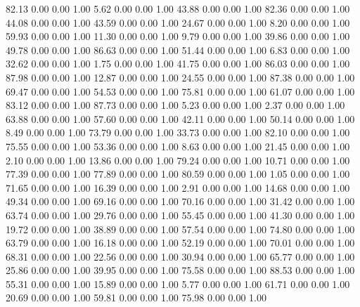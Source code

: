   82.13   0.00   0.00   1.00
    5.62   0.00   0.00   1.00
   43.88   0.00   0.00   1.00
   82.36   0.00   0.00   1.00
   44.08   0.00   0.00   1.00
   43.59   0.00   0.00   1.00
   24.67   0.00   0.00   1.00
    8.20   0.00   0.00   1.00
   59.93   0.00   0.00   1.00
   11.30   0.00   0.00   1.00
    9.79   0.00   0.00   1.00
   39.86   0.00   0.00   1.00
   49.78   0.00   0.00   1.00
   86.63   0.00   0.00   1.00
   51.44   0.00   0.00   1.00
    6.83   0.00   0.00   1.00
   32.62   0.00   0.00   1.00
    1.75   0.00   0.00   1.00
   41.75   0.00   0.00   1.00
   86.03   0.00   0.00   1.00
   87.98   0.00   0.00   1.00
   12.87   0.00   0.00   1.00
   24.55   0.00   0.00   1.00
   87.38   0.00   0.00   1.00
   69.47   0.00   0.00   1.00
   54.53   0.00   0.00   1.00
   75.81   0.00   0.00   1.00
   61.07   0.00   0.00   1.00
   83.12   0.00   0.00   1.00
   87.73   0.00   0.00   1.00
    5.23   0.00   0.00   1.00
    2.37   0.00   0.00   1.00
   63.88   0.00   0.00   1.00
   57.60   0.00   0.00   1.00
   42.11   0.00   0.00   1.00
   50.14   0.00   0.00   1.00
    8.49   0.00   0.00   1.00
   73.79   0.00   0.00   1.00
   33.73   0.00   0.00   1.00
   82.10   0.00   0.00   1.00
   75.55   0.00   0.00   1.00
   53.36   0.00   0.00   1.00
    8.63   0.00   0.00   1.00
   21.45   0.00   0.00   1.00
    2.10   0.00   0.00   1.00
   13.86   0.00   0.00   1.00
   79.24   0.00   0.00   1.00
   10.71   0.00   0.00   1.00
   77.39   0.00   0.00   1.00
   77.89   0.00   0.00   1.00
   80.59   0.00   0.00   1.00
    1.05   0.00   0.00   1.00
   71.65   0.00   0.00   1.00
   16.39   0.00   0.00   1.00
    2.91   0.00   0.00   1.00
   14.68   0.00   0.00   1.00
   49.34   0.00   0.00   1.00
   69.16   0.00   0.00   1.00
   70.16   0.00   0.00   1.00
   31.42   0.00   0.00   1.00
   63.74   0.00   0.00   1.00
   29.76   0.00   0.00   1.00
   55.45   0.00   0.00   1.00
   41.30   0.00   0.00   1.00
   19.72   0.00   0.00   1.00
   38.89   0.00   0.00   1.00
   57.54   0.00   0.00   1.00
   74.80   0.00   0.00   1.00
   63.79   0.00   0.00   1.00
   16.18   0.00   0.00   1.00
   52.19   0.00   0.00   1.00
   70.01   0.00   0.00   1.00
   68.31   0.00   0.00   1.00
   22.56   0.00   0.00   1.00
   30.94   0.00   0.00   1.00
   65.77   0.00   0.00   1.00
   25.86   0.00   0.00   1.00
   39.95   0.00   0.00   1.00
   75.58   0.00   0.00   1.00
   88.53   0.00   0.00   1.00
   55.31   0.00   0.00   1.00
   15.89   0.00   0.00   1.00
    5.77   0.00   0.00   1.00
   61.71   0.00   0.00   1.00
   20.69   0.00   0.00   1.00
   59.81   0.00   0.00   1.00
   75.98   0.00   0.00   1.00
